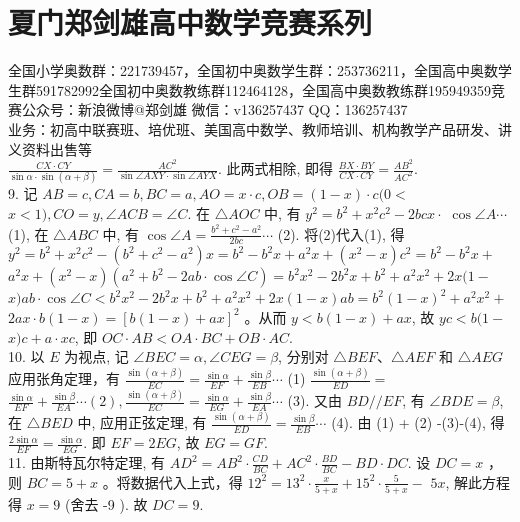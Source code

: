 \documentclass[10pt]{article}
\begin{document}
\section*{夏门郑剑雄高中数学竞赛系列}
全国小学奥数群：221739457，全国初中奥数学生群：253736211，全国高中奥数学生群591782992全国初中奥数教练群112464128，全国高中奥数教练群195949359竞赛公众号：新浪微博@郑剑雄 微信：v136257437 QQ：136257437\\
业务：初高中联赛班、培优班、美国高中数学、教师培训、机构教学产品研发、讲义资料出售等\\
$\frac{C X \cdot C Y}{\sin \alpha \cdot \sin (\alpha+\beta)}=\frac{A C^{2}}{\sin \angle A X Y \cdot \sin \angle A Y X}$. 此两式相除, 即得 $\frac{B X \cdot B Y}{C X \cdot C Y}=\frac{A B^{2}}{A C^{2}}$.\\
9. 记 $A B=c, C A=b, B C=a, A O=x \cdot c, O B=(1-x) \cdot c(0<$ $x<1), C O=y, \angle A C B=\angle C$. 在 $\triangle A O C$ 中, 有 $y^{2}=b^{2}+x^{2} c^{2}-2 b c x \cdot$ $\cos \angle A \cdots$ (1), 在 $\triangle A B C$ 中, 有 $\cos \angle A=\frac{b^{2}+c^{2}-a^{2}}{2 b c} \cdots$ (2). 将(2)代入(1), 得 $y^{2}=b^{2}+x^{2} c^{2}-\left(b^{2}+c^{2}-a^{2}\right) x=b^{2}-b^{2} x+a^{2} x+\left(x^{2}-x\right) c^{2}=b^{2}-b^{2} x+$ $a^{2} x+\left(x^{2}-x\right)\left(a^{2}+b^{2}-2 a b \cdot \cos \angle C\right)=b^{2} x^{2}-2 b^{2} x+b^{2}+a^{2} x^{2}+2 x(1-$ $x) a b \cdot \cos \angle C<b^{2} x^{2}-2 b^{2} x+b^{2}+a^{2} x^{2}+2 x(1-x) a b=b^{2}(1-x)^{2}+a^{2} x^{2}+$ $2 a x \cdot b(1-x)=[b(1-x)+a x]^{2}$ 。从而 $y<b(1-x)+a x$, 故 $y c<b(1-$ $x) c+a \cdot x c$, 即 $O C \cdot A B<O A \cdot B C+O B \cdot A C$.\\
10. 以 $E$ 为视点, 记 $\angle B E C=\alpha, \angle C E G=\beta$, 分别对 $\triangle B E F 、 \triangle A E F$ 和 $\triangle A E G$ 应用张角定理，有 $\frac{\sin (\alpha+\beta)}{E C}=\frac{\sin \alpha}{E F}+\frac{\sin \beta}{E B} \cdots$ (1) $\frac{\sin (\alpha+\beta)}{E D}=$ $\frac{\sin \alpha}{E F}+\frac{\sin \beta}{E A} \cdots(2), \frac{\sin (\alpha+\beta)}{E C}=\frac{\sin \alpha}{E G}+\frac{\sin \beta}{E A} \cdots$ (3). 又由 $B D / / E F$, 有 $\angle B D E=\beta$, 在 $\triangle B E D$ 中, 应用正弦定理, 有 $\frac{\sin (\alpha+\beta)}{E D}=\frac{\sin \beta}{E B} \cdots$ (4). 由 (1) + (2) -(3)-(4), 得 $\frac{2 \sin \alpha}{E F}=\frac{\sin \alpha}{E G}$. 即 $E F=2 E G$, 故 $E G=G F$.\\
11. 由斯特瓦尔特定理, 有 $A D^{2}=A B^{2} \cdot \frac{C D}{B C}+A C^{2} \cdot \frac{B D}{B C}-B D \cdot D C$. 设 $D C=x$ ，则 $B C=5+x$ 。将数据代入上式，得 $12^{2}=13^{2} \cdot \frac{x}{5+x}+15^{2} \cdot \frac{5}{5+x}-$ $5 x$, 解此方程得 $x=9$ (舍去 -9 ). 故 $D C=9$.
\end{document}
